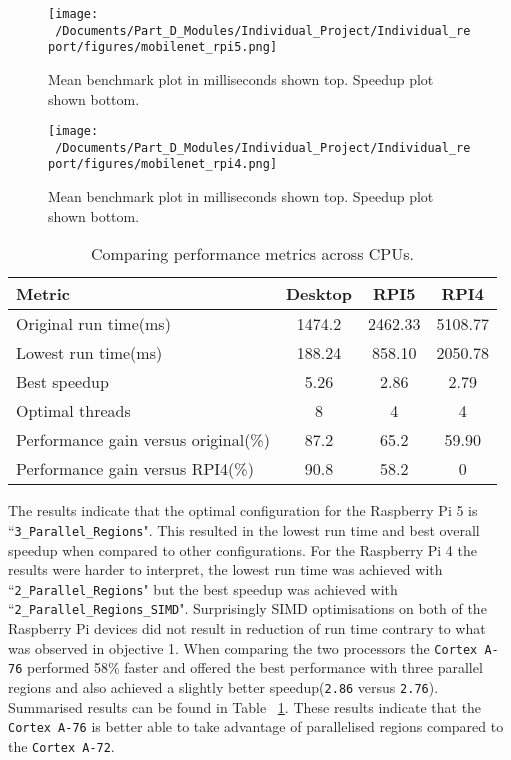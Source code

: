 \begin{figure}[htbp] %
	\centering
	\texttt{[image: ~/Documents/Part\_D\_Modules/Individual\_Project/Individual\_report/figures/mobilenet\_rpi5.png]} %
	\caption{Mean benchmark plot in milliseconds shown top. Speedup plot shown bottom.}
	\label{fig:mobilenet_rpi5_plot} %
\end{figure}

\begin{figure}[htbp] %
	\centering
	\texttt{[image: ~/Documents/Part\_D\_Modules/Individual\_Project/Individual\_report/figures/mobilenet\_rpi4.png]} %
	\caption{Mean benchmark plot in milliseconds shown top. Speedup plot shown bottom.}
	\label{fig:mobilenet_rpi4_plot} %
\end{figure}

\begin{table}[htbp]
	\centering
	\begin{tabular}{@{}lccc@{}}
		\toprule
		\textbf{Metric} & \textbf{Desktop} & \textbf{RPI5} & \textbf{RPI4} \\ \midrule
		Original run time(ms)&1474.2&2462.33 &5108.77 \\ \hline
		Lowest run time(ms)&188.24 &858.10 &2050.78 \\ \hline
		Best speedup&5.26 &2.86 &2.79 \\ \hline
		Optimal threads&8 &4 & 4\\ \hline
		Performance gain versus original(\%)&87.2&65.2 & 59.90\\ \hline
		Performance gain versus RPI4(\%)&90.8 &58.2 &0 \\
		\bottomrule
	\end{tabular}
	\caption{Comparing performance metrics across CPUs.}
	\label{tab:performance_comparison}
\end{table}

The results indicate that the optimal configuration for the Raspberry Pi 5 is ``\texttt{3\_Parallel\_Regions}". This resulted in the lowest run time and best overall speedup when compared to other configurations. For the Raspberry Pi 4 the results were harder to interpret, the lowest run time was achieved with ``\texttt{2\_Parallel\_Regions}" but the best speedup was achieved with ``\texttt{2\_Parallel\_Regions\_SIMD}". Surprisingly SIMD optimisations on both of the Raspberry Pi devices did not result in reduction of run time contrary to what was observed in objective 1. When comparing the two processors the \texttt{Cortex A-76} performed 58\% faster and offered the best performance with three parallel regions and also achieved a slightly better speedup(\texttt{2.86} versus \texttt{2.76}). Summarised results can be found in Table ~\ref{tab:performance_comparison}. These results indicate that the \texttt{Cortex A-76} is better able to take advantage of parallelised regions compared to the \texttt{Cortex A-72}.  

